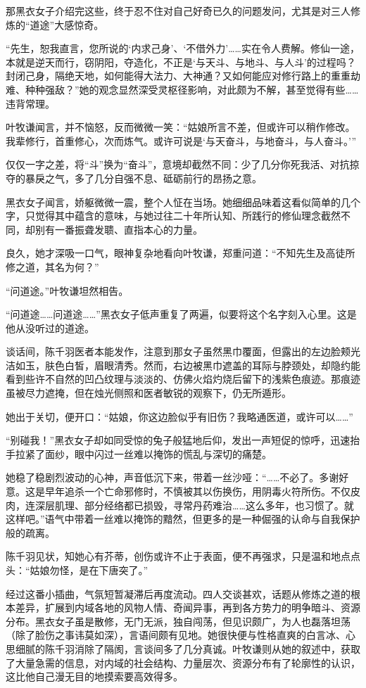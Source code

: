 那黑衣女子介绍完这些，终于忍不住对自己好奇已久的问题发问，尤其是对三人修炼的“道途”大感惊奇。

“先生，恕我直言，您所说的‘内求己身’、‘不借外力’……实在令人费解。修仙一途，本就是逆天而行，窃阴阳，夺造化，不正是‘与天斗、与地斗、与人斗’的过程吗？封闭己身，隔绝天地，如何能得大法力、大神通？又如何能应对修行路上的重重劫难、种种强敌？”她的观念显然深受灵枢径影响，对此颇为不解，甚至觉得有些……违背常理。

叶牧谦闻言，并不恼怒，反而微微一笑：“姑娘所言不差，但或许可以稍作修改。我辈修行，首重修心，次而炼气。或许可说是‘与天奋斗，与地奋斗，与人奋斗。’”

仅仅一字之差，将“斗”换为“奋斗”，意境却截然不同：少了几分你死我活、对抗掠夺的暴戾之气，多了几分自强不息、砥砺前行的昂扬之意。

黑衣女子闻言，娇躯微微一震，整个人怔在当场。她细细品味着这看似简单的几个字，只觉得其中蕴含的意味，与她过往二十年所认知、所践行的修仙理念截然不同，却别有一番振聋发聩、直指本心的力量。

良久，她才深吸一口气，眼神复杂地看向叶牧谦，郑重问道：“不知先生及高徒所修之道，其名为何？”

“问道途。”叶牧谦坦然相告。

“问道途……问道途……”黑衣女子低声重复了两遍，似要将这个名字刻入心里。这是他从没听过的道途。

谈话间，陈千羽医者本能发作，注意到那女子虽然黑巾覆面，但露出的左边脸颊光洁如玉，肤色白皙，眉眼清秀。然而，右边被黑巾遮盖的耳际与脖颈处，却隐约能看到些许不自然的凹凸纹理与淡淡的、仿佛火焰灼烧后留下的浅紫色痕迹。那痕迹虽被尽力遮掩，但在烛光侧照和医者敏锐的观察下，仍无所遁形。

她出于关切，便开口：“姑娘，你这边脸似乎有旧伤？我略通医道，或许可以……”

“别碰我！”黑衣女子却如同受惊的兔子般猛地后仰，发出一声短促的惊呼，迅速抬手拉紧了面纱，眼中闪过一丝难以掩饰的慌乱与深切的痛楚。

她稳了稳剧烈波动的心神，声音低沉下来，带着一丝沙哑：“……不必了。多谢好意。这是早年追杀一个亡命邪修时，不慎被其以伤换伤，用阴毒火符所伤。不仅皮肉，连深层肌理、部分经络都已损毁，寻常丹药难治……这么多年，也习惯了。就这样吧。”语气中带着一丝难以掩饰的黯然，但更多的是一种倔强的认命与自我保护般的疏离。

陈千羽见状，知她心有芥蒂，创伤或许不止于表面，便不再强求，只是温和地点点头：“姑娘勿怪，是在下唐突了。”

经过这番小插曲，气氛短暂凝滞后再度流动。四人交谈甚欢，话题从修炼之道的根本差异，扩展到内域各地的风物人情、奇闻异事，再到各方势力的明争暗斗、资源分布。黑衣女子虽是散修，无门无派，独自闯荡，但见识颇广，为人也磊落坦荡（除了脸伤之事讳莫如深），言语间颇有见地。她很快便与性格直爽的白言冰、心思细腻的陈千羽消除了隔阂，言谈间多了几分真诚。叶牧谦则从她的叙述中，获取了大量急需的信息，对内域的社会结构、力量层次、资源分布有了轮廓性的认识，这比他自己漫无目的地摸索要高效得多。

